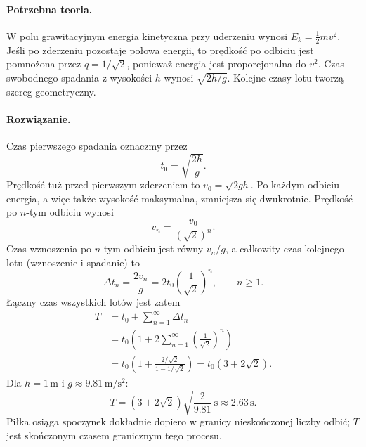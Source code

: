\documentclass[12pt,a4paper]{article}
\numberwithin{equation}{section}
\newcommand{\teoria}{\paragraph{Potrzebna teoria.}}
\newcommand{\rozw}{\paragraph{Rozwiązanie.}}
\begin{document}
\teoria
W polu grawitacyjnym energia kinetyczna przy uderzeniu wynosi
\(E_k=\frac12mv^2\). Jeśli po zderzeniu pozostaje połowa energii, to
prędkość po odbiciu jest pomnożona przez \(q=1/\sqrt2\), ponieważ
energia jest proporcjonalna do \(v^2\). Czas swobodnego spadania
z wysokości \(h\) wynosi \(\sqrt{2h/g}\). Kolejne czasy lotu tworzą
szereg geometryczny.

\rozw
Czas pierwszego spadania oznaczmy przez
\[
  t_0=\sqrt{\frac{2h}{g}}.
\]
Prędkość tuż przed pierwszym zderzeniem to \(v_0=\sqrt{2gh}\).
Po każdym odbiciu energia, a więc także wysokość maksymalna,
zmniejsza się dwukrotnie. Prędkość po \(n\)-tym odbiciu wynosi
\[
  v_n=\frac{v_0}{(\sqrt2)^n}.
\]
Czas wznoszenia po \(n\)-tym odbiciu jest równy \(v_n/g\), a całkowity
czas kolejnego lotu (wznoszenie i spadanie) to
\[
  \Delta t_n=\frac{2v_n}{g}
  =2t_0\left(\frac1{\sqrt2}\right)^n,\qquad n\geq1.
\]
Łączny czas wszystkich lotów jest zatem
\begin{align*}
  T
  &=t_0+\sum_{n=1}^{\infty}\Delta t_n\\
  &=t_0\left(1+2\sum_{n=1}^{\infty}
                  \left(\frac1{\sqrt2}\right)^n\right)\\
  &=t_0\left(1+\frac{2/\sqrt2}{1-1/\sqrt2}\right)
    =t_0(3+2\sqrt2).
\end{align*}
Dla \(h=1\,\mathrm{m}\) i \(g\approx9.81\,\mathrm{m/s^2}\):
\[
  \boxed{T=(3+2\sqrt2)\sqrt{\frac{2}{9.81}}\,\mathrm{s}
         \approx 2.63\,\mathrm{s}.}
\]
Piłka osiąga spoczynek dokładnie dopiero w granicy nieskończonej
liczby odbić; \(T\) jest skończonym czasem granicznym tego procesu.
\end{document}
